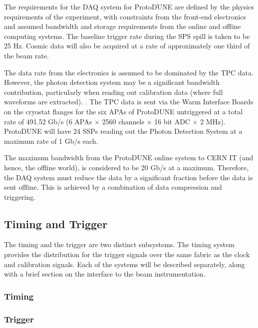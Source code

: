 The requirements for the DAQ system for ProtoDUNE are defined
by the physics requirements of the experiment, with constraints from the
front-end electronics and assumed bandwidth and storage requirements
from the online and offline computing systems.  The baseline trigger
rate during the SPS spill is taken to be 25 Hz.  Cosmic data will also
be acquired at a rate of approximately one third of the beam rate.

The data rate from the electronics is assumed to be dominated by the
TPC data.  However, the photon detection system may be a significant
bandwidth contribution, particularly when reading out calibration data
(where full waveforms are extracted).  .
The TPC data is sent via the Warm Interface Boards on the cryostat flanges
for the six APAs of ProtoDUNE untriggered at a total rate of 491.52 Gb/s
(6 APAs $\times$ 2560 channels $\times$ 16 bit ADC $\times$ 2 MHz).
ProtoDUNE will have 24 SSPs reading out the Photon Detection System at
a maximum rate of 1 Gb/s each.

The maximum bandwidth from the ProtoDUNE online system to CERN IT (and
hence, the offline world), is considered to be 20 Gb/s at a maximum.
Therefore, the DAQ system must reduce the data by a significant fraction
before the data is sent offline.  This is achieved by a combination of
data compression and triggering.


\subsection{Timing and Trigger}

The timing and the trigger are two distinct subsystems.  The timing
system provides the distribution for the trigger signals over the same
fabric as the clock and calibration signals.  Each of the systems will
be described separately, along with a brief section on the interface to
the beam instrumentation.

\subsubsection{Timing}



\subsubsection{Trigger}

